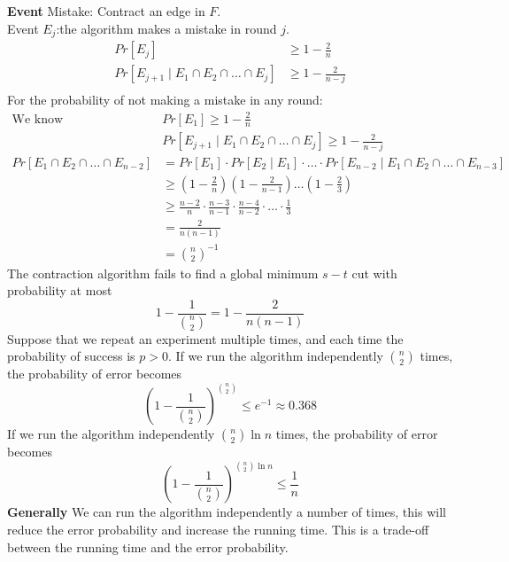 \documentclass[onecolumn]{report}
\begin{document}
\textbf{Event}
Mistake: Contract an edge in $F$.\\
Event $E_j$:the algorithm makes a mistake in round $j$.\\
\begin{align*}
    Pr[E_j]& \geq 1-\frac{2}{n}\\
    Pr[E_{j+1}\mid E_1 \cap E_2 \cap \dots \cap E_j]& \geq 1-\frac{2}{n-j}\\
\end{align*}
For the probability of not making a mistake in any round:
\begin{align*}
    \text{We know  } & Pr[E_1] \geq 1-\frac{2}{n}\\
    &Pr[E_{j+1}\mid E_1 \cap E_2 \cap \dots \cap E_j] \geq 1-\frac{2}{n-j}\\
    Pr[E_1 \cap E_2 \cap \dots \cap E_{n-2}] &= Pr[E_1] \cdot Pr[E_2 \mid E_1] \cdot \dots \cdot Pr[E_{n-2} \mid E_1 \cap E_2 \cap \dots \cap E_{n-3}]\\
    &\geq (1-\frac{2}{n})(1-\frac{2}{n-1})\dots(1-\frac{2}{3})\\
    &\geq \frac{n-2}{n} \cdot \frac{n-3}{n-1} \cdot \frac{n-4}{n-2} \cdot \dots \cdot \frac{1}{3}\\
    &= \frac{2}{n(n-1)}\\
    &= \binom{n}{2}^{-1}
\end{align*}
The contraction algorithm fails to find a global minimum $s-t$ cut with probability at most
\begin{equation*}
    1-\frac{1}{\binom{n}{2}} = 1-\frac{2}{n(n-1)}
\end{equation*}
Suppose that we repeat an experiment multiple times, and each time the probability of success is $p > 0$.
If we run the algorithm independently $\binom{n}{2}$ times, the probability of error becomes
\begin{equation*}
    (1-\frac{1}{\binom{n}{2}})^{\binom{n}{2}} \leq e^{-1} \approx 0.368
\end{equation*}
If we run the algorithm independently $\binom{n}{2} \ln n$ times, the probability of error becomes
\begin{equation*}
    (1-\frac{1}{\binom{n}{2}})^{\binom{n}{2} \ln n} \leq \frac{1}{n}
\end{equation*}
\textbf{Generally}
We can run the algorithm independently a number of times, this will reduce the error probability and increase the running time. This is a trade-off between the running time and the error probability.\\
\end{document}
